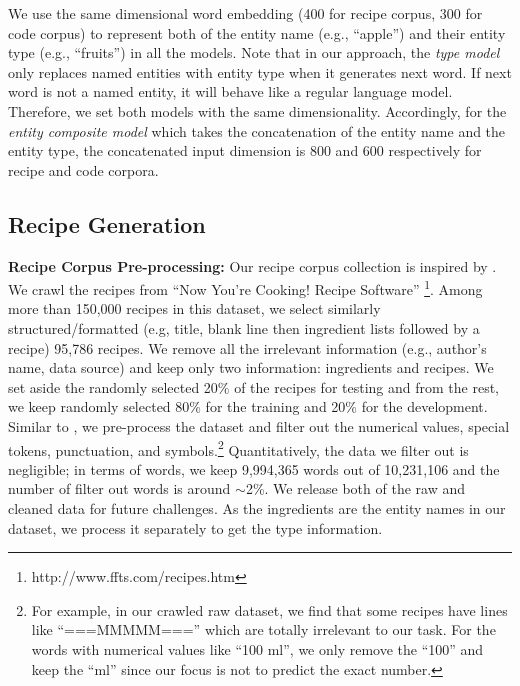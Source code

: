 \documentclass[11pt,a4paper]{article}
\begin{document}
We use the same dimensional word embedding (400 for recipe corpus, 300 for code corpus) to represent both of the entity name (e.g., ``apple'') and their entity type (e.g., ``fruits'') in all the models. Note that in our approach, the \textit{type model} only replaces named entities with entity type when it generates next word. If next word is not a named entity, it will behave like a regular language model. Therefore, we set both models with the same dimensionality. Accordingly, for the \textit{entity composite model} which takes the concatenation of the entity name and the entity type, the concatenated input dimension is 800 and 600 respectively for recipe and code corpora. 





\subsection{Recipe Generation}
\label{recipe_gen}
\textbf{ Recipe Corpus Pre-processing:} Our recipe corpus collection is inspired by \cite{recipe_checklist}. We crawl the recipes from ``Now You’re Cooking! Recipe Software'' \footnote{http://www.ffts.com/recipes.htm}. Among more than 150,000 recipes  in this dataset, we select similarly  structured/formatted (e.g, title, blank line then ingredient lists followed by a recipe) 95,786 recipes. We remove all the irrelevant  information (e.g., author's name, data source) and keep only two information: ingredients and recipes.  We set aside the randomly selected 20\% of the recipes for testing and from the rest, we keep randomly selected 80\% for the training and 20\% for the development.  Similar to \cite{recipe_checklist},  we pre-process the  dataset and  filter out the numerical values, special tokens, punctuation, and symbols.\footnote{For example, in our crawled raw dataset, we find that some recipes have lines like ``===MMMMM==='' which are totally irrelevant to our task. For the words with numerical values like ``100 ml'', we only remove the ``100'' and keep the ``ml'' since our focus is not to predict the exact number.}  Quantitatively, the data we filter out is negligible; in terms of words, we keep 9,994,365 words out of 10,231,106 and the number of filter out words is around $\sim$2\%. We release both of the raw and cleaned data for future challenges. As the ingredients are the entity names in our dataset, we process it separately to get the type information.
\end{document}
